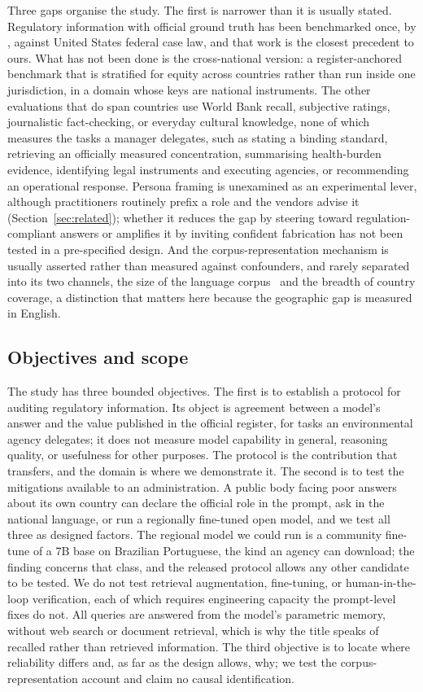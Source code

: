 Three gaps organise the study. The first is narrower than it is usually
stated. Regulatory information with official ground truth has been benchmarked
once, by \citet{dahl2024legal}, against United States federal case law, and that
work is the closest precedent to ours. What has not been done is the
cross-national version: a register-anchored benchmark that is stratified for
equity across countries rather than run inside one jurisdiction, in a domain
whose keys are national instruments. The other evaluations that do span
countries use World Bank recall, subjective ratings, journalistic
fact-checking, or everyday cultural knowledge, none of which measures the tasks
a manager delegates, such as stating a binding standard, retrieving an
officially measured concentration, summarising health-burden evidence,
identifying legal instruments and executing agencies, or recommending an
operational response. Persona framing is unexamined as an
experimental lever, although practitioners routinely prefix a role and the
vendors advise it (Section~\ref{sec:related}); whether it reduces the gap by
steering toward regulation-compliant answers or amplifies it by inviting
confident fabrication has not been tested in a pre-specified design. And the
corpus-representation mechanism is usually asserted rather than measured against
confounders, and rarely separated into its two channels, the size of the
language corpus~\citep{xue2021mt5,abadji2022oscar} and the breadth of
country coverage, a distinction that matters here because the geographic gap is
measured in English.

\subsection*{Objectives and scope}

The study has three bounded objectives. The first is to establish a protocol
for auditing regulatory information. Its object is agreement between a model's
answer and the value published in the official register, for tasks an
environmental agency delegates; it does not measure model capability in general,
reasoning quality, or usefulness for other purposes. The protocol is the
contribution that transfers, and the domain is where we demonstrate it. The
second is to test the mitigations available to an administration. A public body
facing poor answers about its own country can declare the official role in the
prompt, ask in the national language, or run a regionally fine-tuned open
model, and we test all three as designed factors. The regional model we could
run is a community fine-tune of a 7B base on Brazilian Portuguese, the kind an
agency can download; the finding concerns that class, and the released protocol
allows any other candidate to be tested. We do not test retrieval augmentation,
fine-tuning, or human-in-the-loop verification, each of which requires
engineering capacity the prompt-level fixes do not. All queries are answered from
the model's parametric memory, without web search or document retrieval, which
is why the title speaks of recalled rather than retrieved information. The third
objective is to locate where reliability differs and, as far as the design
allows, why; we test the corpus-representation account and claim no causal
identification.

